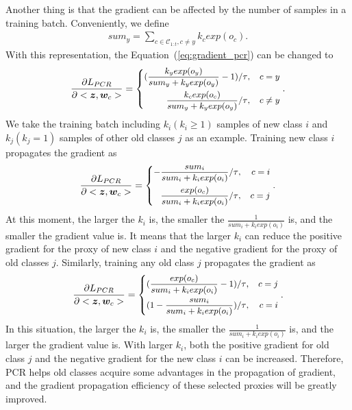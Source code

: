 Another thing is that the gradient can be affected by the number of samples in a training batch. Conveniently, we define
\begin{equation}
\begin{split}
    {sum}_y=\sum_{c\in\mathcal{C}_{1:t},c\neq y}k_cexp(o_c).
\end{split}
\end{equation}
With this representation, the Equation~(\ref{eq:gradient_pcr}) can be changed to 
 \begin{equation}\small
    \label{eq:gradient_pcr_other}
    \frac{\partial L_{PCR}}{\partial <\bm{z},\bm{w}_c>}=\left\{
    \begin{aligned}
        (\frac{k_yexp(o_y)}{{sum}_y+k_yexp(o_y)}-1)/\tau&,&c= y \\
        \frac{k_cexp(o_c)}{{sum}_y+k_yexp(o_y)}/\tau&,&c\neq y
    \end{aligned}
    \right..
\end{equation}
We take the training batch including $k_i (k_i\geq1)$ samples of new class $i$ and $k_j (k_j=1)$ samples of other old classes $j$ as an example. Training new class $i$ propagates the gradient as  
\begin{equation}\small
    \frac{\partial L_{PCR}}{\partial <\bm{z},\bm{w}_c>}=\left\{
    \begin{aligned}
        -\frac{{sum}_i}{{sum}_i+k_iexp(o_i)}/\tau&,&c= i \\
        \frac{exp(o_c)}{{sum}_i+k_iexp(o_i)}/\tau&,&c= j
    \end{aligned}
    \right..
\end{equation}
At this moment, the larger the $k_i$ is, the smaller the $\frac{1}{{sum}_i+k_iexp(o_i)}$ is, and the smaller the gradient value is. It means that the larger $k_i$ can reduce the positive gradient for the proxy of new class $i$ and the negative gradient for the proxy of old classes $j$. Similarly, training any old class $j$ propagates the gradient as
\begin{equation}\small
    \frac{\partial L_{PCR}}{\partial <\bm{z},\bm{w}_c>}=\left\{
    \begin{aligned}
        (\frac{exp(o_c)}{{sum}_i+k_iexp(o_i)}-1)/\tau&,&c= j \\
        (1-\frac{{sum}_i}{{sum}_i+k_iexp(o_i)})/\tau&,&c=i
    \end{aligned}
    \right..
\end{equation}
In this situation, the larger the $k_i$ is, the smaller the $\frac{1}{{sum}_i+k_iexp(o_i)}$ is, and the larger the gradient value is. With larger $k_i$, both the positive gradient for old class $j$ and the negative gradient for the new class $i$ can be increased. Therefore, PCR helps old classes acquire some advantages in the propagation of gradient, and the gradient propagation efficiency of these selected proxies will be greatly improved.

